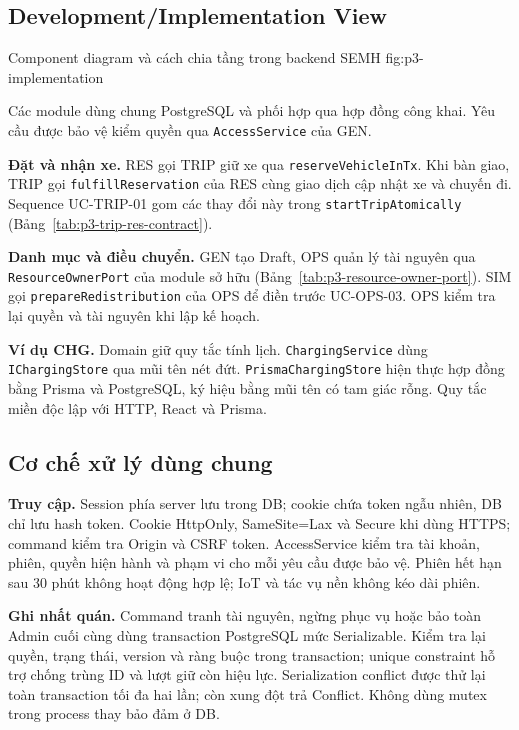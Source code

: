 \subsection{Development/Implementation View}
\providecommand{\ImplementationViewContent}{%
\DesignFigure[0.70\textheight]{../architecture/implementation-view.pdf}
  {Component diagram và cách chia tầng trong backend SEMH}
  {fig:p3-implementation}

Các module dùng chung PostgreSQL và phối hợp qua hợp đồng công khai. Yêu cầu được bảo vệ kiểm quyền qua \texttt{AccessService} của GEN.

\textbf{Đặt và nhận xe.} RES gọi TRIP giữ xe qua \texttt{reserveVehicleInTx}. Khi bàn giao, TRIP gọi \texttt{fulfillReservation} của RES cùng giao dịch cập nhật xe và chuyến đi. Sequence UC-TRIP-01 gom các thay đổi này trong \texttt{startTripAtomically} (Bảng~\ref{tab:p3-trip-res-contract}).

\textbf{Danh mục và điều chuyển.} GEN tạo Draft, OPS quản lý tài nguyên qua \texttt{ResourceOwnerPort} của module sở hữu (Bảng~\ref{tab:p3-resource-owner-port}). SIM gọi \texttt{prepareRedistribution} của OPS để điền trước UC-OPS-03. OPS kiểm tra lại quyền và tài nguyên khi lập kế hoạch.

\textbf{Ví dụ CHG.} Domain giữ quy tắc tính lịch. \texttt{ChargingService} dùng \texttt{IChargingStore} qua mũi tên nét đứt. \texttt{PrismaChargingStore} hiện thực hợp đồng bằng Prisma và PostgreSQL, ký hiệu bằng mũi tên có tam giác rỗng. Quy tắc miền độc lập với HTTP, React và Prisma.
}
\ImplementationViewContent

\ifdefined\CommonProcessingContent\clearpage\fi
\subsection{Cơ chế xử lý dùng chung}
\label{sec:p3-common-processing}
\ifdefined\CommonProcessingContent
  \CommonProcessingContent
\else
\textbf{Truy cập.} Session phía server lưu trong DB; cookie chứa token ngẫu nhiên, DB chỉ lưu hash token. Cookie HttpOnly, SameSite=Lax và Secure khi dùng HTTPS; command kiểm tra Origin và CSRF token. AccessService kiểm tra tài khoản, phiên, quyền hiện hành và phạm vi cho mỗi yêu cầu được bảo vệ. Phiên hết hạn sau 30 phút không hoạt động hợp lệ; IoT và tác vụ nền không kéo dài phiên.

\textbf{Ghi nhất quán.} Command tranh tài nguyên, ngừng phục vụ hoặc bảo toàn Admin cuối cùng dùng transaction PostgreSQL mức Serializable. Kiểm tra lại quyền, trạng thái, version và ràng buộc trong transaction; unique constraint hỗ trợ chống trùng ID và lượt giữ còn hiệu lực. Serialization conflict được thử lại toàn transaction tối đa hai lần; còn xung đột trả Conflict. Không dùng mutex trong process thay bảo đảm ở DB.

